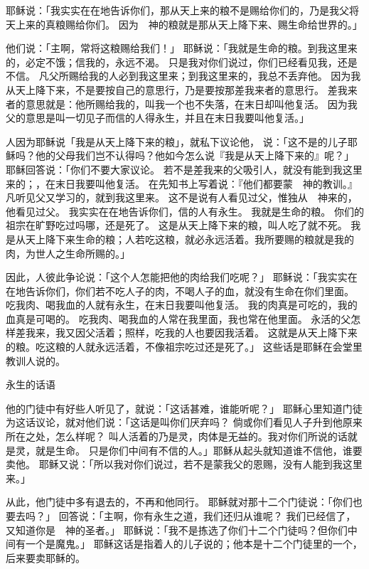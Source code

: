 {耶稣说：「我实实在在地告诉你们，那从天上来的粮不是{}赐给你们的，乃是我父将天上来的真粮赐给你们。
因为　神的粮就是那从天上降下来、赐生命给世界的。」
\par }{\PP {}他们说：「主啊，常将这粮赐给我们！」
耶稣说：「我就是生命的粮。到我这里来的，必定不饿；信我的，永远不渴。
只是我对你们说过，你们已经看见我，还是不信。
凡父所赐给我的人必到我这里来；到我这里来的，我总不丢弃他。
因为我从天上降下来，不是要按自己的意思行，乃是要按那差我来者的意思行。
差我来者的意思就是：他所赐给我的，叫我一个也不失落，在末日却叫他复活。
因为我父的意思是叫一切见子而信的人得永生，并且在末日我要叫他复活。」
\par }{\PP {}人因为耶稣说「我是从天上降下来的粮」，就私下议论他，
说：「这不是{}的儿子耶稣吗？他的父母我们岂不认得吗？他如今怎么说『我是从天上降下来的』呢？」
耶稣回答说：「你们不要大家议论。
若不是差我来的父吸引人，就没有能到我这里来的；{}，在末日我要叫他复活。
在先知书上写着说：『他们都要蒙　神的教训。』凡听见父{}又学习的，就到我这里来。
这不是说有人看见过父，惟独从　神来的，他看见过父。
我实实在在地告诉你们，信的人有永生。
我就是生命的粮。
你们的祖宗在旷野吃过吗哪，还是死了。
这是从天上降下来的粮，叫人吃了就不死。
我是从天上降下来生命的粮；人若吃这粮，就必永远活着。我所要赐的粮就是我的肉，为世人之生命所赐的。」
\par }{\PP {}因此，{}人彼此争论说：「这个人怎能把他的肉给我们吃呢？」
耶稣说：「我实实在在地告诉你们，你们若不吃人子的肉，不喝人子的血，就没有生命在你们里面。
吃我肉、喝我血的人就有永生，在末日我要叫他复活。
我的肉真是可吃的，我的血真是可喝的。
吃我肉、喝我血的人常在我里面，我也常在他里面。
永活的父怎样差我来，我又因父活着；照样，吃我{}的人也要因我活着。
这就是从天上降下来的粮。吃这粮的人就永远活着，不像{}祖宗吃过{}还是死了。」
这些话是耶稣在{}会堂里教训人说的。
\par }{\SH 永生的话语
\par }{\PP {}他的门徒中有好些人听见了，就说：「这话甚难，谁能听呢？」
耶稣心里知道门徒为这话议论，就对他们说：「这话是叫你们厌弃吗？
倘或你们看见人子升到他原来所在之处，怎么样呢？
叫人活着的乃是灵，肉体是无益的。我对你们所说的话就是灵，就是生命。
只是你们中间有不信的人。」耶稣从起头就知道谁不信他，谁要卖他。
耶稣又说：「所以我对你们说过，若不是蒙我父的恩赐，没有人能到我这里来。」
\par }{\PP {}从此，他门徒中多有退去的，不再和他同行。
耶稣就对那十二个门徒说：「你们也要去吗？」
回答说：「主啊，你有永生之道，我们还归从谁呢？
我们已经信了，又知道你是　神的圣者。」
耶稣说：「我不是拣选了你们十二个门徒吗？但你们中间有一个是魔鬼。」
耶稣这话是指着{}人{}的儿子{}说的；他本是十二个门徒里的一个，后来要卖耶稣的。

}
